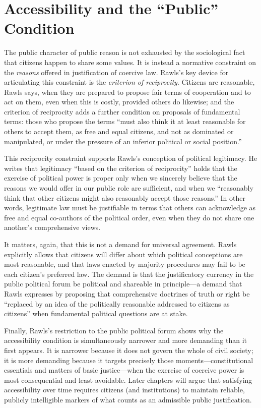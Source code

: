 \documentclass[12pt]{report}
\begin{document}
\section{Accessibility and the “Public” Condition}

The public character of public reason is not exhausted by the sociological fact that citizens happen to share some values. It is instead a normative constraint on the \emph{reasons} offered in justification of coercive law. Rawls’s key device for articulating this constraint is the \emph{criterion of reciprocity}. Citizens are reasonable, Rawls says, when they are prepared to propose fair terms of cooperation and to act on them, even when this is costly, provided others do likewise; and the criterion of reciprocity adds a further condition on proposals of fundamental terms: those who propose the terms “must also think it at least reasonable for others to accept them, as free and equal citizens, and not as dominated or manipulated, or under the pressure of an inferior political or social position.”\parencite[p.~771]{rawls1997public}

This reciprocity constraint supports Rawls’s conception of political legitimacy. He writes that legitimacy “based on the criterion of reciprocity” holds that the exercise of political power is proper only when we sincerely believe that the reasons we would offer in our public role are sufficient, and when we “reasonably think that other citizens might also reasonably accept those reasons.”\parencite[p.~771]{rawls1997public} In other words, legitimate law must be justifiable in terms that others can acknowledge as free and equal co-authors of the political order, even when they do not share one another’s comprehensive views.

It matters, again, that this is not a demand for universal agreement. Rawls explicitly allows that citizens will differ about which political conceptions are most reasonable, and that laws enacted by majority procedures may fail to be each citizen’s preferred law.\parencite[p.~771]{rawls1997public} The demand is that the justificatory currency in the public political forum be political and shareable in principle---a demand that Rawls expresses by proposing that comprehensive doctrines of truth or right be “replaced by an idea of the politically reasonable addressed to citizens as citizens” when fundamental political questions are at stake.\parencite[p.~766]{rawls1997public}

Finally, Rawls’s restriction to the public political forum shows why the accessibility condition is simultaneously narrower and more demanding than it first appears. It is narrower because it does not govern the whole of civil society; it is more demanding because it targets precisely those moments---constitutional essentials and matters of basic justice---when the exercise of coercive power is most consequential and least avoidable.\parencite[p.~767]{rawls1997public} Later chapters will argue that satisfying accessibility over time requires citizens (and institutions) to maintain reliable, publicly intelligible markers of what counts as an admissible public justification.
\end{document}
